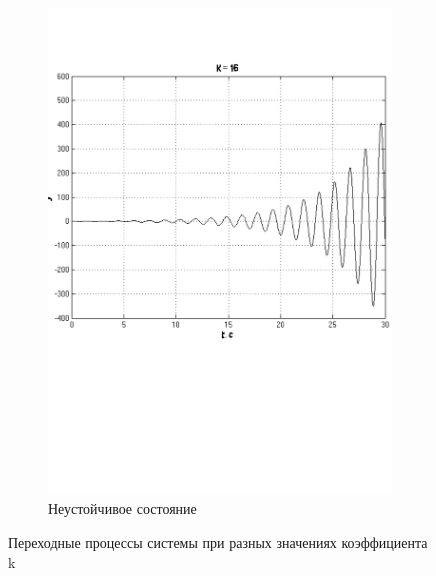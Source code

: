 \documentclass[a4paper, 11pt, russian]{article}
\begin{document}
\begin{figure}[ht!]
\begin{subfigure}[b]{0.48\textwidth}
            \includegraphics[width = \textwidth]{unstable}
            \centering
            \caption{Неустойчивое состояние}
        \end{subfigure}
        \caption{Переходные процессы системы при разных значениях коэффициента k}
    \end{figure}
    \clearpage
\end{document}
